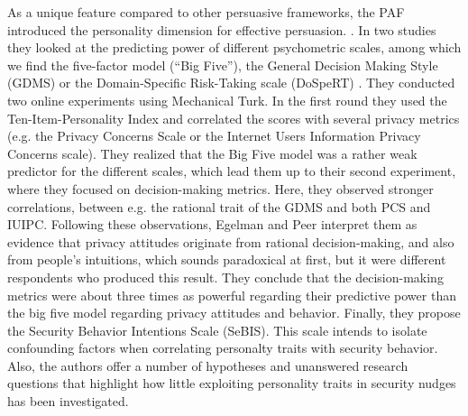 	
	
	As a unique feature compared to other persuasive frameworks, the \gls{PAF} introduced the personality dimension for effective persuasion. . In two studies they looked at the predicting power of different psychometric scales, among which we find the five-factor model (``Big Five''), the General Decision Making Style (GDMS) or the Domain-Specific Risk-Taking scale (DoSpeRT) . They conducted two online experiments using Mechanical Turk. In the first round they used the Ten-Item-Personality Index and correlated the scores with several privacy metrics (e.g. the Privacy Concerns Scale or the Internet Users Information Privacy Concerns scale). They realized that the Big Five model was a rather weak predictor for the different scales, which lead them up to their second experiment, where they focused on decision-making metrics. Here, they observed stronger correlations, between e.g. the rational trait of the GDMS and both PCS and IUIPC. Following these observations, Egelman and Peer interpret them as evidence that privacy attitudes originate from rational decision-making, and also from people's intuitions, which sounds paradoxical at first, but it were different respondents who produced this result. They conclude that the decision-making metrics were about three times as powerful regarding their predictive power than the big five model regarding privacy attitudes and behavior. Finally, they propose the Security Behavior Intentions Scale (SeBIS). This scale intends to isolate confounding factors when correlating personalty traits with security behavior. Also, the authors offer a number of hypotheses and unanswered research questions that highlight how little exploiting personality traits in security nudges has been investigated. 